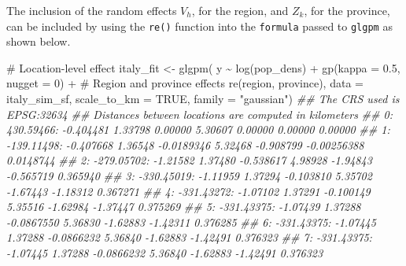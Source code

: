\documentclass[
  letterpaper,
]{krantz}
\newenvironment{Shaded}{\begin{snugshade}}{\end{snugshade}}
\newcommand{\AttributeTok}[1]{\textcolor[rgb]{0.40,0.45,0.13}{#1}}
\newcommand{\CommentTok}[1]{\textcolor[rgb]{0.37,0.37,0.37}{#1}}
\newcommand{\ConstantTok}[1]{\textcolor[rgb]{0.56,0.35,0.01}{#1}}
\newcommand{\DecValTok}[1]{\textcolor[rgb]{0.68,0.00,0.00}{#1}}
\newcommand{\DocumentationTok}[1]{\textcolor[rgb]{0.37,0.37,0.37}{\textit{#1}}}
\newcommand{\FloatTok}[1]{\textcolor[rgb]{0.68,0.00,0.00}{#1}}
\newcommand{\FunctionTok}[1]{\textcolor[rgb]{0.28,0.35,0.67}{#1}}
\newcommand{\NormalTok}[1]{\textcolor[rgb]{0.00,0.23,0.31}{#1}}
\newcommand{\OtherTok}[1]{\textcolor[rgb]{0.00,0.23,0.31}{#1}}
\newcommand{\SpecialCharTok}[1]{\textcolor[rgb]{0.37,0.37,0.37}{#1}}
\newcommand{\StringTok}[1]{\textcolor[rgb]{0.13,0.47,0.30}{#1}}
\begin{document}
The inclusion of the random effects \(V_h\), for the region, and
\(Z_k\), for the province, can be included by using the \texttt{re()}
function into the \texttt{formula} passed to \texttt{glgpm} as shown
below.

\begin{Shaded}
\begin{Highlighting}[]

                        \CommentTok{\# Location{-}level effect}
\NormalTok{italy\_fit }\OtherTok{\textless{}{-}} \FunctionTok{glgpm}\NormalTok{( y }\SpecialCharTok{\textasciitilde{}} \FunctionTok{log}\NormalTok{(pop\_dens) }\SpecialCharTok{+} \FunctionTok{gp}\NormalTok{(}\AttributeTok{kappa =} \FloatTok{0.5}\NormalTok{, }\AttributeTok{nugget =} \DecValTok{0}\NormalTok{) }\SpecialCharTok{+}
                        \CommentTok{\# Region and province effects}
                        \FunctionTok{re}\NormalTok{(region, province),}
         \AttributeTok{data =}\NormalTok{ italy\_sim\_sf, }\AttributeTok{scale\_to\_km =} \ConstantTok{TRUE}\NormalTok{,}
         \AttributeTok{family =} \StringTok{"gaussian"}\NormalTok{)}
\DocumentationTok{\#\# The CRS used is EPSG:32634 }
\DocumentationTok{\#\# Distances between locations are computed in kilometers }
\DocumentationTok{\#\#   0:     430.59466: {-}0.404481  1.33798  0.00000  5.30607  0.00000  0.00000  0.00000}
\DocumentationTok{\#\#   1:    {-}139.11498: {-}0.407668  1.36548 {-}0.0189346  5.32468 {-}0.908799 {-}0.00256388 0.0148744}
\DocumentationTok{\#\#   2:    {-}279.05702: {-}1.21582  1.37480 {-}0.538617  4.98928 {-}1.94843 {-}0.565719 0.365940}
\DocumentationTok{\#\#   3:    {-}330.45019: {-}1.11959  1.37294 {-}0.103810  5.35702 {-}1.67443 {-}1.18312 0.367271}
\DocumentationTok{\#\#   4:    {-}331.43272: {-}1.07102  1.37291 {-}0.100149  5.35516 {-}1.62984 {-}1.37447 0.375269}
\DocumentationTok{\#\#   5:    {-}331.43375: {-}1.07439  1.37288 {-}0.0867550  5.36830 {-}1.62883 {-}1.42311 0.376285}
\DocumentationTok{\#\#   6:    {-}331.43375: {-}1.07445  1.37288 {-}0.0866232  5.36840 {-}1.62883 {-}1.42491 0.376323}
\DocumentationTok{\#\#   7:    {-}331.43375: {-}1.07445  1.37288 {-}0.0866232  5.36840 {-}1.62883 {-}1.42491 0.376323}


\end{Highlighting}
\end{Shaded}
\end{document}
